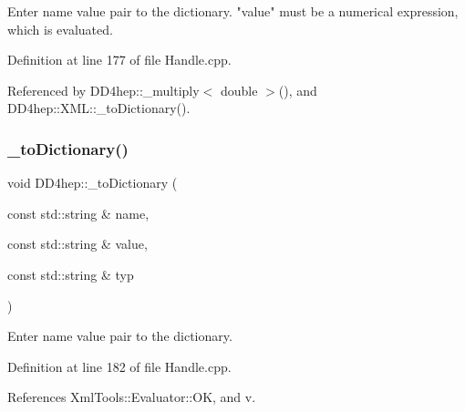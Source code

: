 Enter name value pair to the dictionary. "value" must be a numerical expression, which is evaluated. 



Definition at line 177 of file Handle.\+cpp.



Referenced by D\+D4hep\+::\+\_\+multiply$<$ double $>$(), and D\+D4hep\+::\+X\+M\+L\+::\+\_\+to\+Dictionary().

\hypertarget{group___d_d4_h_e_p___g_e_o_m_e_t_r_y_gae255c713c9960e1779d1f16bb16b1d63}{}\label{group___d_d4_h_e_p___g_e_o_m_e_t_r_y_gae255c713c9960e1779d1f16bb16b1d63} 
\subsubsection{\texorpdfstring{\+\_\+to\+Dictionary()}{\_toDictionary()}\hspace{0.1cm}{\footnotesize\ttfamily [2/2]}}
{\footnotesize\ttfamily void D\+D4hep\+::\+\_\+to\+Dictionary (\begin{DoxyParamCaption}\item[{const std\+::string \&}]{name,  }\item[{const std\+::string \&}]{value,  }\item[{const std\+::string \&}]{typ }\end{DoxyParamCaption})}



Enter name value pair to the dictionary. 



Definition at line 182 of file Handle.\+cpp.



References Xml\+Tools\+::\+Evaluator\+::\+OK, and v.

\hypertarget{group___d_d4_h_e_p___g_e_o_m_e_t_r_y_ga76e95737ef946f88e7477f69f677a4e2}{}\label{group___d_d4_h_e_p___g_e_o_m_e_t_r_y_ga76e95737ef946f88e7477f69f677a4e2} 
